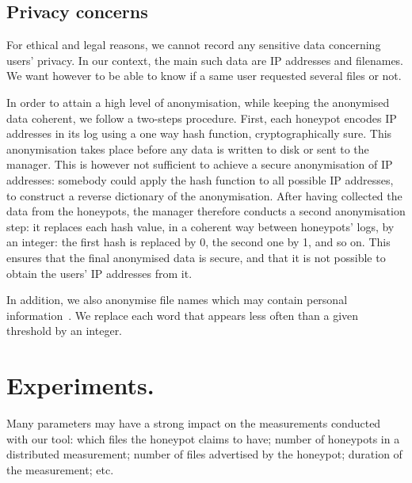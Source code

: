 \documentclass[final,
notitlepage,
narroweqnarray,
	inline,
	twoside,
]{ieee}
\begin{document}
\subsection{Privacy concerns }
For ethical and legal reasons, we cannot record any 
sensitive data concerning users' privacy.
In our context, the main such data are IP addresses and filenames.
We want however to be able to know if a same user requested several
files or not.

In order to attain a high level of anonymisation, while keeping the anonymised
data coherent, we follow a two-steps procedure.
First, each
honeypot encodes IP addresses in its log using a one way hash function,
cryptographically sure. This anonymisation takes place before any data is written
to disk or sent to the manager.
This is however not sufficient to achieve a secure anonymisation of IP addresses:
somebody could apply the hash function to all  possible IP addresses,
to construct a reverse dictionary of the anonymisation.
After having collected the data from the honeypots,
the manager therefore conducts a second anonymisation step:
it replaces each hash value, in a
coherent way between honeypots' logs,
by an integer: the first hash is replaced by 0, the second one by 1, and so on.
This ensures that the final anonymised data is secure,
and that it is not possible to obtain the users' IP addresses from it.

In addition, we also anonymise file names which may contain personal 
information~\cite{file-inf,Adar2007}. 
We replace each word that appears less often than a given threshold by an integer.


\section{Experiments.}
\label{sec-measurements}

Many parameters may have a strong impact on the measurements conducted with our tool: which files the honeypot claims to have; number of honeypots in a distributed measurement; number of files advertised by the honeypot; duration of the measurement; etc.
\end{document}
